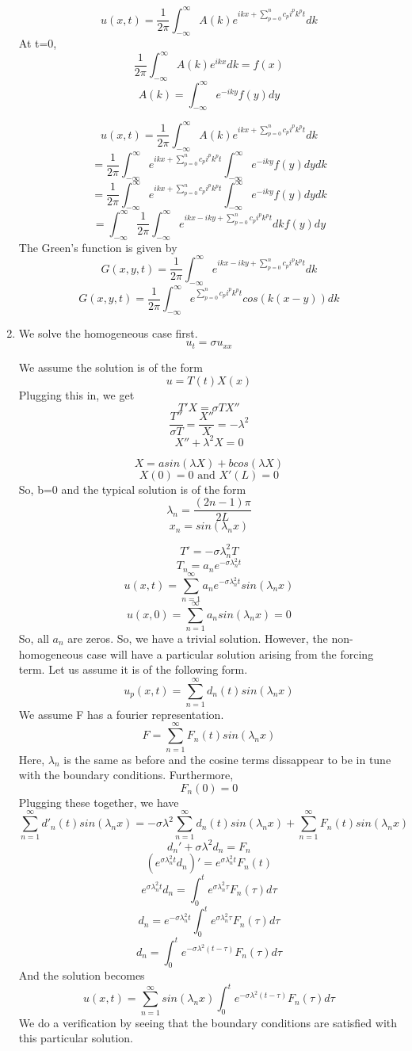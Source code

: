 \documentclass[a4paper,12 pt]{article}
\begin{document}
\begin{enumerate}
	\[u(x,t)= \frac{1}{2\pi}\int_{-\infty}^{\infty}A(k) e^{ikx+\sum_{p=0}^{n} c_p i^pk^p t} dk\]
	At t=0,
	\[\frac{1}{2\pi}\int_{-\infty}^{\infty}A(k) e^{ikx}dk= f(x) \]
	\[A(k)= \int_{-\infty}^{\infty} e^{-iky} f(y)dy \]
	
	\[u(x,t)= \frac{1}{2\pi}\int_{-\infty}^{\infty}A(k) e^{ikx+\sum_{p=0}^{n} c_p i^pk^pt} dk\]
	\[= \frac{1}{2\pi}\int_{-\infty}^{\infty} e^{ikx+\sum_{p=0}^{n} c_p i^pk^pt} \int_{-\infty}^{\infty} e^{-iky} f(y)dy dk\]
	\[= \frac{1}{2\pi}\int_{-\infty}^{\infty} e^{ikx+\sum_{p=0}^{n} c_p i^pk^pt} \int_{-\infty}^{\infty} e^{-iky} f(y)dy dk\]
	\[= \int_{-\infty}^{\infty} \frac{1}{2\pi} \int_{-\infty}^{\infty} e^{ikx-iky+\sum_{p=0}^{n} c_p i^pk^pt}dk f(y)dy \]
	The Green's function is given by
	\[G(x,y,t)=\frac{1}{2\pi} \int_{-\infty}^{\infty} e^{ikx-iky+\sum_{p=0}^{n} c_p i^pk^pt}dk \]
	\[G(x,y,t)=\frac{1}{2\pi} \int_{-\infty}^{\infty} e^{\sum_{p=0}^{n} c_p i^pk^pt}cos(k(x-y))dk \]
	\item We solve the homogeneous case first.
	\[ u_{t} = \sigma u_{xx}\]

 We assume the solution is of the form 
 \[u = T(t)X(x)\]
 Plugging this in, we get
 \[T'X =\sigma TX'' \]
 \[\frac{T''}{\sigma T}=\frac{X''}{X}=-\lambda^2\]
 \[ X''+\lambda^2X =0\]

\[ X= a sin(\lambda X)+ b cos(\lambda X)\]
\[X(0)=0 \text{ and }X'(L)=0\]
So, b=0 and the typical solution is of the form
\[\lambda_n = \frac{(2n-1)\pi}{2L}\]
\[x_n=sin(\lambda_n x)\]


\[T' = -\sigma \lambda_n^2 T\]
\[T_n= a_n e^{-\sigma \lambda_n^2t}\]
\[u(x,t)=\sum_{n=1}^{\infty}a_n e^{-\sigma \lambda_n^2t}sin(\lambda_n x)\]
\[u(x,0)=\sum_{n=1}^{\infty}a_nsin(\lambda_n x)=0\]
So, all $a_n$ are zeros. So, we have a trivial solution.
However, the non-homogeneous case will have a particular solution arising from the forcing term. Let us assume it is of the following form.
\[u_p(x,t)=\sum_{n=1}^{\infty} d_n(t) sin(\lambda_n x)\]
We assume F has a fourier representation.
\[F= \sum_{n=1}^{\infty} F_n(t) sin(\lambda_n x)\]
Here, $\lambda_n$ is the same as before and the cosine terms dissappear to be in tune with the boundary conditions. Furthermore, \[F_n(0)=0\]
Plugging these together, we have
\[\sum_{n=1}^{\infty} d'_n(t) sin(\lambda_n x)= -\sigma \lambda^2\sum_{n=1}^{\infty} d_n(t) sin(\lambda_n x)+ \sum_{n=1}^{\infty} F_n(t) sin(\lambda_n x)\]
\[d_n'+\sigma \lambda^2d_n = F_n\]
\[(e^{\sigma \lambda_n^2 t}d_n)'= e^{\sigma \lambda_n^2 t}F_n(t) \]
\[e^{\sigma \lambda_n^2 t}d_n= \int_{0}^{t} e^{\sigma \lambda_n^2 \tau}F_n(\tau)d\tau \]
\[d_n=e^{-\sigma \lambda_n^2 t} \int_{0}^{t} e^{\sigma \lambda_n^2 \tau}F_n(\tau)d\tau \]
\[d_n= \int_{0}^{t}e^{-\sigma \lambda^2(t-\tau)}F_n(\tau)d\tau\]
And the solution becomes
\[u(x,t)=\sum_{n=1}^{\infty}  sin(\lambda_n x)\int_{0}^{t}e^{-\sigma \lambda^2(t-\tau)}F_n(\tau) d\tau\]
We do a verification by seeing that the boundary conditions are satisfied with this particular solution.

	\end{enumerate} 
	
\end{document}
